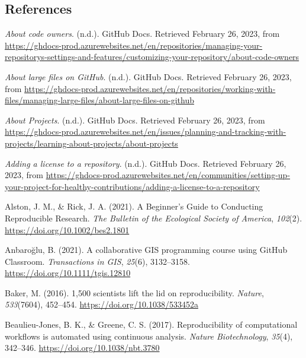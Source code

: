 \hypertarget{references}{%
\subsection{References}\label{references}}

\hypertarget{refs}{}
\begin{CSLReferences}{1}{0}
\leavevmode{}%
\emph{About code owners}. (n.d.). GitHub Docs. Retrieved February 26, 2023, from \url{https://ghdocs-prod.azurewebsites.net/en/repositories/managing-your-repositorys-settings-and-features/customizing-your-repository/about-code-owners}

\leavevmode{}%
\emph{About large files on GitHub}. (n.d.). GitHub Docs. Retrieved February 26, 2023, from \url{https://ghdocs-prod.azurewebsites.net/en/repositories/working-with-files/managing-large-files/about-large-files-on-github}

\leavevmode{}%
\emph{About Projects}. (n.d.). GitHub Docs. Retrieved February 26, 2023, from \url{https://ghdocs-prod.azurewebsites.net/en/issues/planning-and-tracking-with-projects/learning-about-projects/about-projects}

\leavevmode{}%
\emph{Adding a license to a repository}. (n.d.). GitHub Docs. Retrieved February 26, 2023, from \url{https://ghdocs-prod.azurewebsites.net/en/communities/setting-up-your-project-for-healthy-contributions/adding-a-license-to-a-repository}

\leavevmode{}%
Alston, J. M., \& Rick, J. A. (2021). A Beginner's Guide to Conducting Reproducible Research. \emph{The Bulletin of the Ecological Society of America}, \emph{102}(2). \url{https://doi.org/10.1002/bes2.1801}

\leavevmode{}%
Anbaroğlu, B. (2021). A collaborative GIS programming course using GitHub Classroom. \emph{Transactions in GIS}, \emph{25}(6), 3132--3158. \url{https://doi.org/10.1111/tgis.12810}

\leavevmode{}%
Baker, M. (2016). 1,500 scientists lift the lid on reproducibility. \emph{Nature}, \emph{533}(7604), 452--454. \url{https://doi.org/10.1038/533452a}

\leavevmode{}%
Beaulieu-Jones, B. K., \& Greene, C. S. (2017). Reproducibility of computational workflows is automated using continuous analysis. \emph{Nature Biotechnology}, \emph{35}(4), 342--346. \url{https://doi.org/10.1038/nbt.3780}


\end{CSLReferences}
